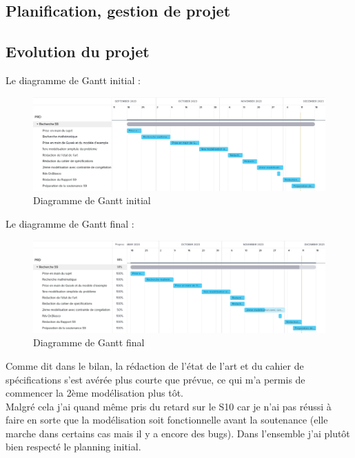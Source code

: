 \documentclass{polytech/polytech}
\numberwithin{figure}{chapter}
\begin{document}
\begin{appendix}

\chapter{Planification, gestion de projet}   

\section{Evolution du projet}

Le diagramme de Gantt initial :
\begin{figure}[ht]
    \centering
    \includegraphics[width=\textwidth]{pic/gantts91.png}
    \caption{Diagramme de Gantt initial}
\end{figure}

Le diagramme de Gantt final :
\begin{figure}[ht]
    \centering
    \includegraphics[width=\textwidth]{pic/gantts92.png}
    \caption{Diagramme de Gantt final}
\end{figure}

Comme dit dans le bilan, la rédaction de l'état de l'art et du cahier de spécifications s'est avérée plus courte que prévue, ce qui m'a permis de commencer la 2ème modélisation plus tôt.\\
Malgré cela j'ai quand même pris du retard sur le S10 car je n'ai pas réussi à faire en sorte que la modélisation soit fonctionnelle avant la soutenance (elle marche dans certains cas mais il y a encore des bugs).
Dans l'ensemble j'ai plutôt bien respecté le planning initial.


\end{appendix}
\end{document}
